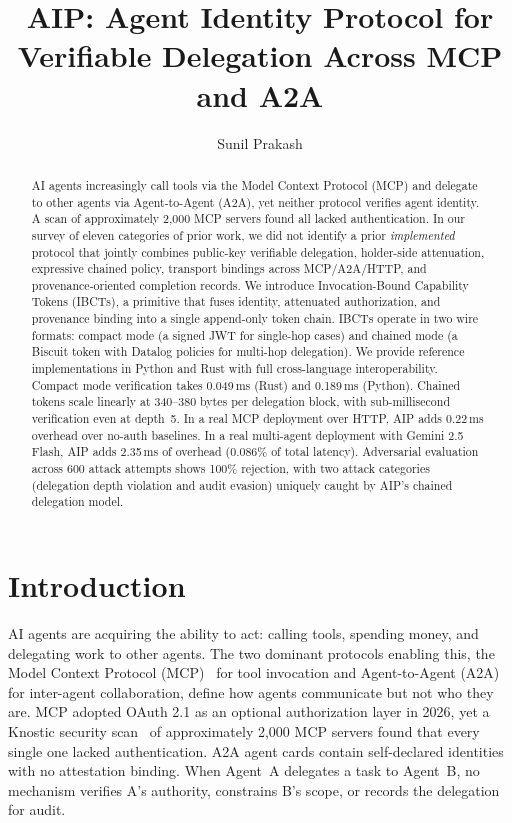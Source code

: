 \documentclass[11pt,a4paper]{article}
\newcommand{\aip}{\textsc{AIP}}
\newcommand{\ibct}{\textsc{IBCT}}
\newcommand{\atoa}{\textsc{A2A}}
\newcommand{\mcp}{\textsc{MCP}}
\begin{document}
\title{AIP: Agent Identity Protocol for Verifiable Delegation Across MCP and A2A}

\author[1]{Sunil Prakash}
\date{}

\maketitle

\begin{abstract}
AI agents increasingly call tools via the Model Context Protocol (\mcp{}) and delegate to other agents via Agent-to-Agent (\atoa{}), yet neither protocol verifies agent identity. A scan of approximately 2,000 \mcp{} servers found all lacked authentication. In our survey of eleven categories of prior work, we did not identify a prior \textit{implemented} protocol that jointly combines public-key verifiable delegation, holder-side attenuation, expressive chained policy, transport bindings across MCP/A2A/HTTP, and provenance-oriented completion records. We introduce Invocation-Bound Capability Tokens (\ibct{}s), a primitive that fuses identity, attenuated authorization, and provenance binding into a single append-only token chain. \ibct{}s operate in two wire formats: compact mode (a signed JWT for single-hop cases) and chained mode (a Biscuit token with Datalog policies for multi-hop delegation). We provide reference implementations in Python and Rust with full cross-language interoperability. Compact mode verification takes 0.049\,ms (Rust) and 0.189\,ms (Python). Chained tokens scale linearly at 340--380 bytes per delegation block, with sub-millisecond verification even at depth~5. In a real MCP deployment over HTTP, \aip{} adds 0.22\,ms overhead over no-auth baselines. In a real multi-agent deployment with Gemini 2.5 Flash, \aip{} adds 2.35\,ms of overhead (0.086\% of total latency). Adversarial evaluation across 600 attack attempts shows 100\% rejection, with two attack categories (delegation depth violation and audit evasion) uniquely caught by \aip{}'s chained delegation model.
\end{abstract}

\section{Introduction}
\label{sec:intro}

AI agents are acquiring the ability to act: calling tools, spending money, and delegating work to other agents. The two dominant protocols enabling this, the Model Context Protocol (\mcp{})~\citep{anthropic2024mcp} for tool invocation and Agent-to-Agent (\atoa{})~\citep{google2025a2a} for inter-agent collaboration, define how agents communicate but not who they are. \mcp{} adopted OAuth 2.1 as an optional authorization layer in 2026, yet a Knostic security scan~\citep{knostic2025scan} of approximately 2,000 \mcp{} servers found that every single one lacked authentication. \atoa{} agent cards contain self-declared identities with no attestation binding. When Agent~A delegates a task to Agent~B, no mechanism verifies A's authority, constrains B's scope, or records the delegation for audit.
\end{document}
